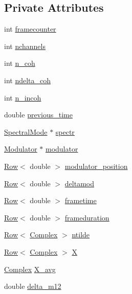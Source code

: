 \subsection*{Private Attributes}
\begin{DoxyCompactItemize}
\item 
int \hyperlink{classFTPedretti_a6aab8bf34752e2003fd24429b5deabf0}{framecounter}
\item 
int \hyperlink{classFTPedretti_a617b319f056add9357e59becefdf629f}{nchannels}
\item 
int \hyperlink{classFTPedretti_ad60e472d0ef298c0ccd9255662d2e92e}{n\_\-coh}
\item 
int \hyperlink{classFTPedretti_a62797d32a2a9efb508a6a50e37537bca}{ndelta\_\-coh}
\item 
int \hyperlink{classFTPedretti_a80d65a4169e0885939736694bc76f4a8}{n\_\-incoh}
\item 
double \hyperlink{classFTPedretti_a363822135e76101433c55c8556da68e5}{previous\_\-time}
\item 
\hyperlink{classSpectralMode}{SpectralMode} $\ast$ \hyperlink{classFTPedretti_a154536c2195506b9c254e417cf752cb6}{spectr}
\item 
\hyperlink{classModulator}{Modulator} $\ast$ \hyperlink{classFTPedretti_ac366c4d6cd99a518c673d3636ab97245}{modulator}
\item 
\hyperlink{classRow}{Row}$<$ double $>$ \hyperlink{classFTPedretti_aeb6720656e824ab24b4f70d31cd7b40d}{modulator\_\-position}
\item 
\hyperlink{classRow}{Row}$<$ double $>$ \hyperlink{classFTPedretti_a576b58f03f27f35cdf75aa1e988b2982}{deltamod}
\item 
\hyperlink{classRow}{Row}$<$ double $>$ \hyperlink{classFTPedretti_a3100d1c07aa75cee3c5c81814f92f8c3}{frametime}
\item 
\hyperlink{classRow}{Row}$<$ double $>$ \hyperlink{classFTPedretti_a760d972f67ceec4fbfb8defb7b44db8e}{frameduration}
\item 
\hyperlink{classRow}{Row}$<$ \hyperlink{Matrix_8h_a37333e1628babc1863d6963489e5e9ea}{Complex} $>$ \hyperlink{classFTPedretti_a974818e3a26fcb5bff164d3b6af61e50}{ntilde}
\item 
\hyperlink{classRow}{Row}$<$ \hyperlink{Matrix_8h_a37333e1628babc1863d6963489e5e9ea}{Complex} $>$ \hyperlink{classFTPedretti_a3b9e230976542d982323faaae89341bf}{X}
\item 
\hyperlink{Matrix_8h_a37333e1628babc1863d6963489e5e9ea}{Complex} \hyperlink{classFTPedretti_a900b82719031d79c46298d544eb1d313}{X\_\-avg}
\item 
double \hyperlink{classFTPedretti_aa195ccba303a9bbf0e87de722e4e29c3}{delta\_\-m12}
\end{DoxyCompactItemize}


